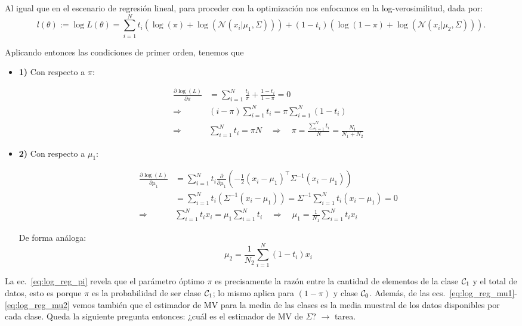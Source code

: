 Al igual que en el escenario de regresión lineal, para proceder con la optimización nos enfocamos en la log-verosimilitud, dada por:	
	\begin{equation}
	l(\theta) := \log L(\theta) = \sum_{i=1}^{N}t_i(\log(\pi)+\log(\mathcal{N}(x_i|\mu_1,\Sigma)))+(1-t_i)(\log(1-\pi)+\log(\mathcal{N}(x_i|\mu_2,\Sigma))). 
		\end{equation}

Aplicando entonces las condiciones de primer orden, tenemos que 
\begin{itemize}
	
\item \textbf{1)} Con respecto a $\pi$:
	
	\begin{align}
	\frac{\partial\log(L)}{\partial\pi} &= \sum_{i=1}^N \frac{t_i}{\pi}+\frac{1-t_i}{1-\pi}=0\nonumber\\
	\Rightarrow \quad & (i-\pi)\sum_{i=1}^Nt_i = \pi\sum_{i=1}^N(1-t_i)\nonumber\\
	\Rightarrow \quad & \sum_{i=1}^Nt_i=\pi N \quad\Rightarrow\quad \pi = \frac{\sum_{i=1}^Nt_i}{N} = \frac{N_1}{N_1+N_2} \label{eq:log_reg_pi}
	\end{align}
		
\item \textbf{2)} Con respecto a $\mu_1$:
	
	\begin{align}
	\frac{\partial\log(L)}{\partial\mu_1} &= \sum_{i=1}^N t_i
	\frac{\partial}{\partial \mu_1}(-\frac{1}{2}(x_i-\mu_1)^\top \Sigma^{-1}(x_i-\mu_1))\nonumber\\
	&= \sum_{i=1}^N t_i(\Sigma^{-1}(x_i-\mu_1)) =
	\Sigma^{-1}\sum_{i=1}^N t_i(x_i-\mu_1) = 0\nonumber\\
	\Rightarrow\quad & \sum_{i=1}^Nt_ix_i= \mu_1\sum_{i=1}^N t_i
	\quad\Rightarrow\quad \mu_1 = \frac{1}{N_1}\sum_{i=1}^Nt_ix_i \label{eq:log_reg_mu1}
	\end{align}
	
	De forma análoga:
	\begin{equation}
	\mu_2 = \frac{1}{N_2}\sum_{i=1}^N(1-t_i)x_i\label{eq:log_reg_mu2}
	\end{equation}
	
\end{itemize}

\begin{remark}\label{rem:log_reg_interpretacion_ML}
La ec.~\eqref{eq:log_reg_pi} revela que el parámetro  óptimo $\pi$ es precisamente la razón entre la cantidad de elementos de la clase ${\mathcal C}_1$ y el total de datos, esto es porque $\pi$ es la probabilidad de ser clase ${\mathcal C}_1$; lo mismo aplica para $(1-\pi)$ y clase ${\mathcal C}_0$. Además, de las ecs.~\eqref{eq:log_reg_mu1}-\eqref{eq:log_reg_mu2} vemos también que el estimador de MV para la media de las clases es la media muestral de los datos disponibles por cada clase. Queda la siguiente pregunta entonces: ¿cuál es el estimador de MV de $\Sigma$? $\rightarrow$ tarea.
\end{remark}

